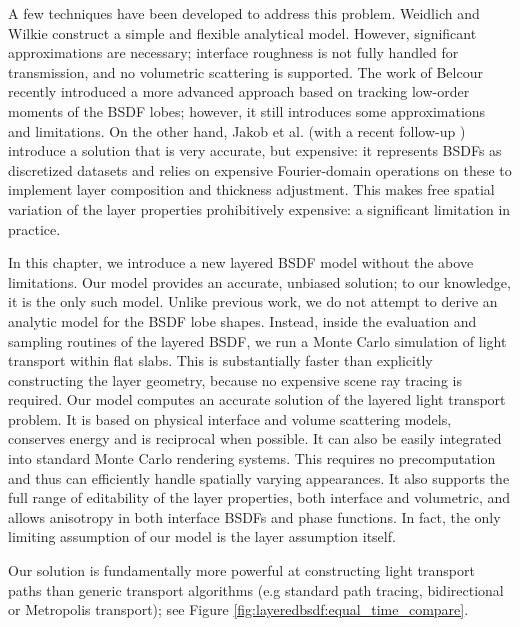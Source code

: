 A few techniques have been developed to address this problem. Weidlich and Wilkie \cite{weidlich2007arbitrarily} construct a simple and flexible analytical model. However, significant approximations are necessary; interface roughness is not fully handled for transmission, and no volumetric scattering is supported. The work of Belcour \cite{belcour2018efficient} recently introduced a more advanced approach based on tracking low-order moments of the BSDF lobes; however, it still introduces some approximations and limitations. On the other hand, Jakob et al. \cite{jakob2014comprehensive} (with a recent follow-up \cite{zeltner2018layer}) introduce a solution that is very accurate, but expensive: it represents BSDFs as discretized datasets and relies on expensive Fourier-domain operations on these to implement layer composition and thickness adjustment. This makes free spatial variation of the layer properties prohibitively expensive: a significant limitation in practice.

In this chapter, we introduce a new layered BSDF model without the above limitations. Our model provides an accurate, unbiased solution; to our knowledge, it is the only such model.
Unlike previous work, we do not attempt to derive an analytic model for the BSDF lobe shapes. Instead, inside the evaluation and sampling routines of the layered BSDF, we run a Monte Carlo simulation of light transport within flat slabs.
This is substantially faster than explicitly constructing the layer geometry, because no expensive scene ray tracing is required.
Our model computes an accurate solution of the layered light transport problem.
It is based on physical interface and volume scattering models, conserves energy and is reciprocal when possible. It can also be easily integrated into standard Monte Carlo rendering systems.
This requires no precomputation and thus can efficiently handle spatially varying appearances. It also supports the full range of editability of the layer properties, both interface and volumetric, and allows anisotropy in both interface BSDFs and phase functions. In fact, the only limiting assumption of our model is the layer assumption itself.

Our solution is fundamentally more powerful at constructing light transport paths than generic transport algorithms (e.g standard path tracing, bidirectional or Metropolis transport); see Figure \ref{fig:layeredbsdf:equal_time_compare}. 


